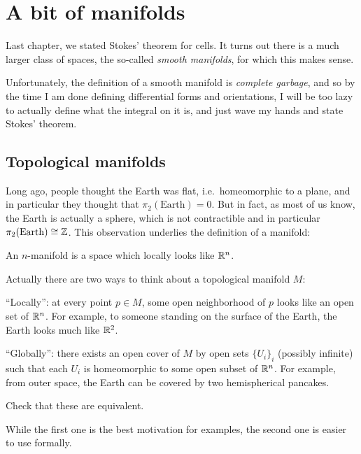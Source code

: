 \chapter{A bit of manifolds}
Last chapter, we stated Stokes' theorem for cells.
It turns out there is a much larger class of spaces,
the so-called \emph{smooth manifolds}, for which this makes sense.

Unfortunately, the definition of a smooth manifold is \emph{complete garbage},
and so by the time I am done defining differential forms and orientations,
I will be too lazy to actually define what the integral on it is,
and just wave my hands and state Stokes' theorem.

\section{Topological manifolds}

Long ago, people thought the Earth was flat,
i.e.\ homeomorphic to a plane, and in particular they thought that
$\pi_2(\text{Earth}) = 0$.
But in fact, as most of us know, the Earth is actually a sphere,
which is not contractible and in particular $\pi_2(\text{Earth}) \cong \mathbb Z$.
This observation underlies the definition of a manifold:
\begin{moral}
	An $n$-manifold is a space which locally looks like $\mathbb R^n$.
\end{moral}
Actually there are two ways to think about a topological manifold $M$:
\begin{itemize}
	\ii ``Locally'': at every point $p \in M$,
	some open neighborhood of $p$ looks like an open set of $\mathbb R^n$.
	For example, to someone standing on the surface of the Earth,
	the Earth looks much like $\mathbb R^2$.

	\ii ``Globally'': there exists an open cover of $M$
	by open sets $\{U_i\}_i$ (possibly infinite) such that each $U_i$
	is homeomorphic to some open subset of $\mathbb R^n$.
	For example, from outer space, the Earth can be covered
	by two hemispherical pancakes.
\end{itemize}
\begin{ques}
	Check that these are equivalent.
\end{ques}
While the first one is the best motivation for examples,
the second one is easier to use formally.

